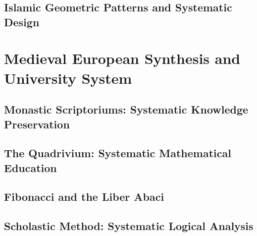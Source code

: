 \documentclass[12pt, oneside, openany]{book}
\let\oldchapter\chapter
\renewcommand{\chapter}{
	\cleardoublepage
	\thispagestyle{chapter}
	\oldchapter
}
\begin{document}
\section{Islamic Geometric Patterns and Systematic Design}


\chapter{Medieval European Synthesis and University System}

\section{Monastic Scriptoriums: Systematic Knowledge Preservation}

\section{The Quadrivium: Systematic Mathematical Education}

\section{Fibonacci and the Liber Abaci}

\section{Scholastic Method: Systematic Logical Analysis}

\end{document}
